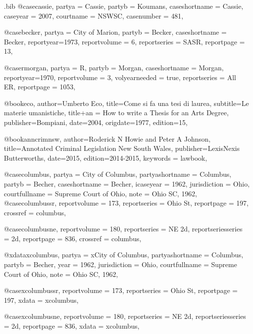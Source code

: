 \begin{filecontents*}[overwrite]{\jobname.bib}
@case{cassie,
  partya = {Cassie}, 
  partyb = {Koumans},
  caseshortname = {Cassie},
  caseyear = {2007},
  courtname = {NSWSC},
  casenumber = {481},
	}


@case{becker,
  partya = {City of Marion}, 
  partyb = {Becker},
  caseshortname = {Becker},
  reportyear={1973},
  reportvolume = {6},
  reportseries = {SASR},
  reportpage = {13},
	}

@case{rmorgan,
  partya = {R}, 
  partyb = {Morgan},
  caseshortname = {Morgan},
  reportyear={1970},
  reportvolume = {3},
  volyearneeded = {true},
  reportseries = {All ER},
  reportpage = {1053},
	}


@book{eco,
author={Umberto Eco},
title={Come si fa una tesi di laurea},
subtitle={Le materie umanistiche},
title+an = {How to write a Thesis for an Arts Degree},
publisher={Bompiani},
date={2004},
origdate={1977},
edition={15},
}

@book{anncrimnsw,
author={Roderick N Howie and Peter A Johnson},
title={Annotated Criminal Legislation New South Wales},
publisher={LexisNexis Butterworths},
date={2015},
edition={2014-2015},
keywords = {lawbook},
}

@case{columbus,
  partya = {City of Columbus},
  partyashortname = {Columbus}, 
  partyb = {Becher},
  caseshortname = {Becher},
  icaseyear = {1962},
  jurisdiction = {Ohio},
  courtfullname = {Supreme Court of Ohio},
  note = {Ohio SC, 1962},
	}
@case{columbussr,
  reportvolume = {173},
  reportseries = {Ohio St},
  reportpage = {197},
  crossref = {columbus},
}

@case{columbusne,
  reportvolume = {180},
  reportseries = {NE 2d},
  reportseriesseries = {2d},
  reportpage = {836},
  crossref = {columbus},
}

@xdata{xcolumbus,
  partya = {xCity of Columbus},
  partyashortname = {Columbus}, 
  partyb = {Becher},
  year = {1962},
  jurisdiction = {Ohio},
  courtfullname = {Supreme Court of Ohio},
  note = {Ohio SC, 1962},
	}
	
@case{xcolumbussr,
  reportvolume = {173},
  reportseries = {Ohio St},
  reportpage = {197},
  xdata = {xcolumbus},
}

@case{xcolumbusne,
  reportvolume = {180},
  reportseries = {NE 2d},
  reportseriesseries = {2d},
  reportpage = {836},
  xdata = {xcolumbus},
}



\end{filecontents*}
